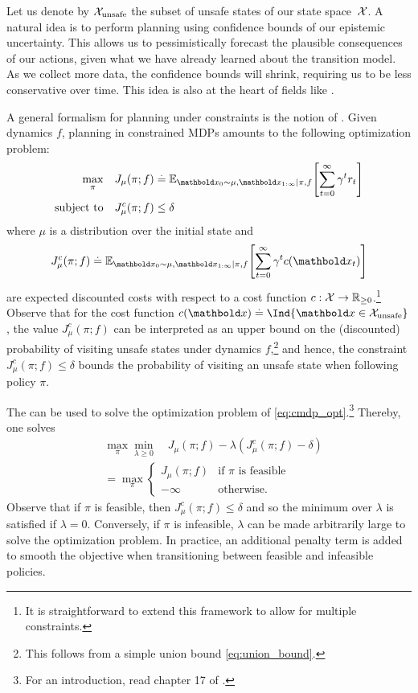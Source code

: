 Let us denote by $\mathcal{X}_\mathrm{unsafe}$ the subset of unsafe states of our state space~$\mathcal{X}$.
A natural idea is to perform planning using confidence bounds of our epistemic uncertainty.
This allows us to pessimistically forecast the plausible consequences of our actions, given what we have already learned about the transition model.
As we collect more data, the confidence bounds will shrink, requiring us to be less conservative over time.
This idea is also at the heart of fields like .

A general formalism for planning under constraints is the notion of  \citep{altman1999constrained}.
Given dynamics $f$, planning in constrained MDPs amounts to the following optimization problem: \begin{subequations}\begin{align}
  \max_\pi \quad&J_{\mu}(\pi; f) \defeq \E[\vx_0 \sim \mu, \vx_{1:\infty} \mid \pi, f]{\sum_{t=0}^\infty \gamma^t r_t} \\
  \text{subject to} \quad&J_{\mu}^{c}(\pi; f) \leq \delta
\end{align}\label{eq:cmdp_opt}\end{subequations} where $\mu$ is a distribution over the initial state and \begin{align}
  J_{\mu}^{c}(\pi; f) \defeq \E[\vx_0 \sim \mu, \vx_{1:\infty} \mid \pi, f]{\sum_{t=0}^\infty \gamma^t c(\vx_t)}
\end{align} are expected discounted costs with respect to a cost function ${c : \mathcal{X} \to \mathbb{R}_{\geq 0}}$.\footnote{It is straightforward to extend this framework to allow for multiple constraints.}
Observe that for the cost function $c(\vx) \defeq \Ind{\vx \in \spX_\mathrm{unsafe}}$, the value $J_{\mu}^c(\pi; f)$ can be interpreted as an upper bound on the (discounted) probability of visiting unsafe states under dynamics $f$,\footnote{This follows from a simple union bound \eqref{eq:union_bound}.} and hence, the constraint $J_{\mu}^c(\pi; f) \leq \delta$ bounds the probability of visiting an unsafe state when following policy $\pi$.

The  can be used to solve the optimization problem of \cref{eq:cmdp_opt}.\footnote{For an introduction, read chapter 17 of .}
Thereby, one solves \begin{align}
  &\max_\pi \min_{\lambda \geq 0} \quad J_\mu(\pi; f) - \lambda (J_\mu^{c}(\pi; f) - \delta) \\
  &= \max_\pi \begin{cases}
    J_\mu(\pi; f) & \text{if $\pi$ is feasible} \\
    -\infty & \text{otherwise}.
  \end{cases}
\end{align}
Observe that if $\pi$ is feasible, then $J_\mu^{c}(\pi; f) \leq \delta$ and so the minimum over $\lambda$ is satisfied if $\lambda = 0$.
Conversely, if $\pi$ is infeasible, $\lambda$ can be made arbitrarily large to solve the optimization problem.
In practice, an additional penalty term is added to smooth the objective when transitioning between feasible and infeasible policies.

